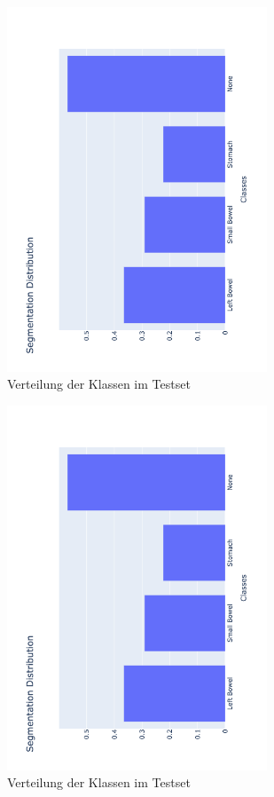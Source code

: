 \begin{figure}[htb]
	\begin{center}
		\includegraphics[width=220pt , angle=270]{bilder/segmentation_distribution}
		\caption{Verteilung der Klassen im Testset}\label{Fig:klassenverteilung}
	\end{center}
\end{figure}

\begin{figure}[htb]
	\begin{center}
		\includegraphics[width=220pt , angle=270]{bilder/segmentation_distribution}
		\caption{Verteilung der Klassen im Testset}\label{Fig:klassenverteilung}
	\end{center}
\end{figure}

\pagebreak